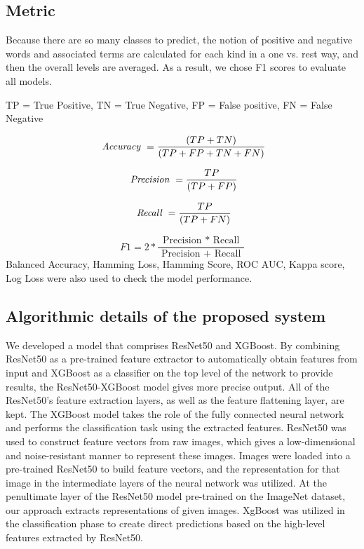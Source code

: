 \documentclass[sigconf]{acmart}
\begin{document}
\subsection{Metric}
Because there are so many classes to predict, the notion of positive and negative words and associated terms are calculated for each kind in a one vs. rest way, and then the overall levels are averaged. As a result, we chose F1 scores to evaluate all models.
   
 

  TP = True Positive, TN = True Negative, FP = False positive, FN = False Negative
 
\begin{equation}
\emph{ Accuracy }=\frac{(T P+T N)}{(T P+F P+T N+F N)}
\end{equation}

		
\begin{equation}
\emph{ Precision }=\frac{ TP}{( TP + FP)}
\end{equation}

\begin{equation}
\emph{ Recall }=\frac{ TP }{( TP + FN )}
\end{equation}


    \begin{equation}
    F1=2 * \frac{\text { Precision * Recall }}{\text { Precision + Recall }}
    \end{equation}
Balanced Accuracy, Hamming Loss, Hamming Score, ROC AUC, Kappa score, Log Loss were also used to check the model performance.
\subsection{Algorithmic details of the proposed system }
We developed a model that comprises ResNet50 and XGBoost. By combining ResNet50 as a pre-trained feature extractor to automatically obtain features from input and XGBoost as a classifier on the top level of the network to provide results, the ResNet50-XGBoost model gives more precise output. All of the ResNet50's feature extraction layers, as well as the feature flattening layer, are kept. The XGBoost model takes the role of the fully connected neural network and performs the classification task using the extracted features. ResNet50 was used to construct feature vectors from raw images, which gives a low-dimensional and noise-resistant manner to represent these images. Images were loaded into a pre-trained ResNet50 to build feature vectors, and the representation for that image in the intermediate layers of the neural network was utilized. At the penultimate layer of the ResNet50 model pre-trained on the ImageNet dataset, our approach extracts representations of given images. XgBoost was utilized in the classification phase to create direct predictions based on the high-level features extracted by ResNet50.
\end{document}
